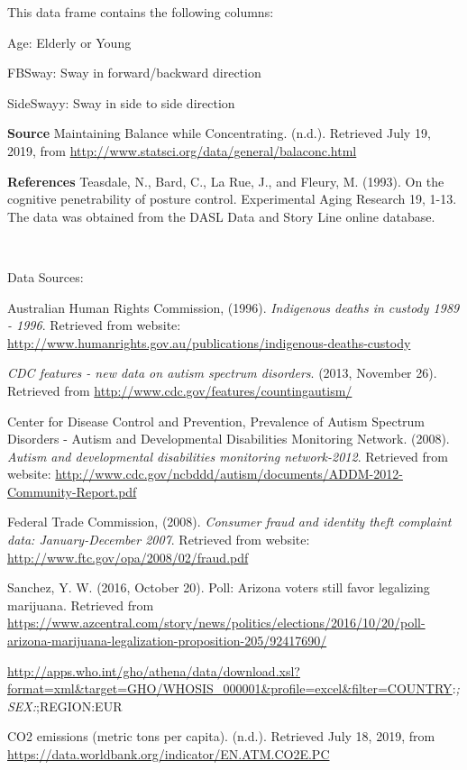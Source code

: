 \documentclass[]{book}
\begin{document}
This data frame contains the following columns:

Age: Elderly or Young

FBSway: Sway in forward/backward direction

SideSwayy: Sway in side to side direction

\textbf{Source}
Maintaining Balance while Concentrating. (n.d.). Retrieved July 19, 2019, from \url{http://www.statsci.org/data/general/balaconc.html}

\textbf{References}
Teasdale, N., Bard, C., La Rue, J., and Fleury, M. (1993). On the cognitive penetrability of posture control. Experimental Aging Research 19, 1-13.
The data was obtained from the DASL Data and Story Line online database.

\textbf{\\
}

Data Sources:

Australian Human Rights Commission, (1996). \emph{Indigenous deaths in
custody 1989 - 1996}. Retrieved from website:
\url{http://www.humanrights.gov.au/publications/indigenous-deaths-custody}

\emph{CDC features - new data on autism spectrum disorders}. (2013, November
26). Retrieved from \url{http://www.cdc.gov/features/countingautism/}

Center for Disease Control and Prevention, Prevalence of Autism Spectrum
Disorders - Autism and Developmental Disabilities Monitoring Network.
(2008). \emph{Autism and developmental disabilities monitoring network-2012}.
Retrieved from website:
\url{http://www.cdc.gov/ncbddd/autism/documents/ADDM-2012-Community-Report.pdf}

Federal Trade Commission, (2008). \emph{Consumer fraud and identity theft
complaint data: January-December 2007}. Retrieved from website:
\url{http://www.ftc.gov/opa/2008/02/fraud.pdf}

Sanchez, Y. W. (2016, October 20). Poll: Arizona voters still favor legalizing marijuana. Retrieved from \url{https://www.azcentral.com/story/news/politics/elections/2016/10/20/poll-arizona-marijuana-legalization-proposition-205/92417690/}

\url{http://apps.who.int/gho/athena/data/download.xsl?format=xml\&target=GHO/WHOSIS_000001\&profile=excel\&filter=COUNTRY}:\emph{;SEX:};REGION:EUR

CO2 emissions (metric tons per capita). (n.d.). Retrieved July 18, 2019, from \url{https://data.worldbank.org/indicator/EN.ATM.CO2E.PC}
\end{document}
